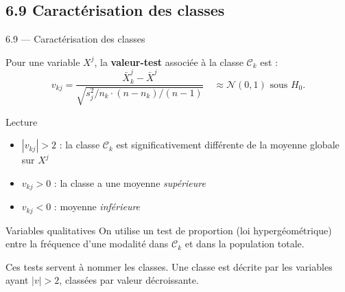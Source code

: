 \subsection{6.9 Caractérisation des classes}
\begin{frame}{6.9 — Caractérisation des classes}
\begin{definition}
Pour une variable $X^j$, la \textbf{valeur-test} associée à la classe $\mathcal{C}_k$ est :
\[
v_{kj} = \frac{\bar{X}^j_k - \bar{X}^j}{\sqrt{s_j^2 / n_k \cdot (n - n_k)/(n-1)}}
\quad \approx \mathcal{N}(0, 1) \text{ sous } H_0.
\]
\end{definition}

\begin{block}{Lecture}
\begin{itemize}\small
  \item $|v_{kj}| > 2$ : la classe $\mathcal{C}_k$ est \alert{significativement} différente
        de la moyenne globale sur $X^j$
  \item $v_{kj} > 0$ : la classe a une moyenne \emph{supérieure}
  \item $v_{kj} < 0$ : moyenne \emph{inférieure}
\end{itemize}
\end{block}

\begin{block}{Variables qualitatives}
\small On utilise un test de proportion (loi hypergéométrique) entre la
fréquence d'une modalité dans $\mathcal{C}_k$ et dans la population totale.
\end{block}

\begin{rema}
\small Ces tests servent à \alert{nommer} les classes. Une classe est décrite
par les variables ayant $|v| > 2$, classées par valeur décroissante.
\end{rema}
\end{frame}


